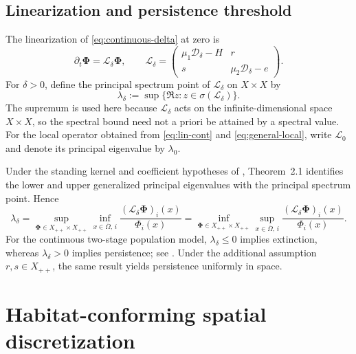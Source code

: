 \documentclass[11pt]{article}
\theoremstyle{definition}
\newcommand{\cD}{\mathcal{D}}
\newcommand{\cL}{\mathcal{L}}
\newcommand{\PhiV}{\bm\Phi}
\begin{document}
\subsection{Linearization and persistence threshold}

The linearization of \eqref{eq:continuous-delta} at zero is
\begin{equation}
\label{eq:lin-cont}
 \partial_t\PhiV=\cL_\delta\PhiV,
 \qquad
 \cL_\delta=
 \begin{pmatrix}
 \mu_1\cD_\delta-H&r\\
 s&\mu_2\cD_\delta-e
 \end{pmatrix}.
\end{equation}
For $\delta>0$, define the principal spectrum point of $\cL_\delta$ on $X\times X$ by
\begin{equation}
\label{eq:lambda-cont}
 \lambda_\delta
 :=\sup\{\Re z:z\in\sigma(\cL_\delta)\}.
\end{equation}
The supremum is used here because $\cL_\delta$ acts on the
infinite-dimensional space $X\times X$, so the spectral bound need not
a priori be attained by a spectral value.
For the local operator obtained from \eqref{eq:lin-cont} and \eqref{eq:general-local}, write $\cL_0$ and denote its principal eigenvalue by $\lambda_0$.

Under the standing kernel and coefficient hypotheses of \cite{Onyido2024}, Theorem~2.1 identifies the lower and upper generalized principal eigenvalues with the principal spectrum point.  Hence
\begin{equation}
\label{eq:CW-cont}
 \lambda_\delta
 =\sup_{\PhiV\in X_{++}\times X_{++}}
 \inf_{x\in\overline\Omega,\,i}
 \frac{(\cL_\delta\PhiV)_i(x)}{\Phi_i(x)}
 =\inf_{\PhiV\in X_{++}\times X_{++}}
 \sup_{x\in\overline\Omega,\,i}
 \frac{(\cL_\delta\PhiV)_i(x)}{\Phi_i(x)}.
\end{equation}
For the continuous two-stage population model, $\lambda_\delta\le0$ implies extinction, whereas $\lambda_\delta>0$ implies persistence; see \cite[Theorem~1]{Onyido2023}.  Under the additional assumption $r,s\in X_{++}$, the same result yields persistence uniformly in space.

\section{Habitat-conforming spatial discretization}
\label{sec:habitat-discretization}
\end{document}
